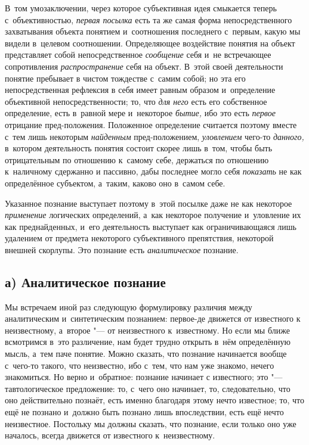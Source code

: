 В~том умозаключении, через которое субъективная идея смыкается
теперь с~объективностью, {\em первая
посылка} есть та же самая форма непосредственного
захватывания объекта понятием и~соотношения последнего с~первым, какую мы
видели в~целевом соотношении. Определяющее воздействие понятия на объект
представляет собой непосредственное
{\em сообщение} себя и~не
встречающее сопротивления
{\em распространение}
себя на объект. В~этой своей деятельности понятие пребывает в
чистом тождестве с~самим собой; но эта его непосредственная рефлексия в
себя имеет равным образом и~определение объективной непосредственности; то,
что {\em для него} есть
его собственное определение, есть в~равной мере и~некоторое
{\em бытие,} ибо это есть
{\em первое} отрицание
пред-положения. Положенное определение считается поэтому вместе
с~тем лишь некоторым {\em найденным}
пред-положением,
{\em уловлением} чего-то
{\em данного,} в~котором
деятельность понятия состоит скорее лишь в~том, чтобы быть отрицательным по
отношению к~самому себе, держаться по отношению к~наличному сдержанно и
пассивно, дабы последнее могло себя
{\em показать} не как
определённое субъектом, а~таким, каково оно в~самом себе.

Указанное познание выступает поэтому в~этой посылке даже не
как некоторое {\em применение}
логических определений, а~как некоторое получение и~уловление
их как преднайденных, и~его деятельность выступает как ограничивающаяся
лишь удалением от предмета некоторого субъективного препятствия, некоторой
внешней скорлупы. Это познание есть
{\em аналитическое}
познание.

\subsection[а) Аналитическое познание]{а) Аналитическое познание}

Мы встречаем иной раз следующую формулировку различия между
аналитическим и~синтетическим познанием: первое-де движется от известного к
неизвестному, а~второе "--- от неизвестного к~известному. Но
если мы ближе всмотримся в~это различение, нам будет трудно открыть в~нём
определённую мысль, а~тем паче понятие. Можно сказать, что познание
начинается вообще с~чего-то такого, что неизвестно, ибо с~тем, что нам уже
знакомо, нечего знакомиться. Но верно и~обратное: познание начинает с
известного; это "--- тавтологическое предложение: то, с~чего
оно начинает, то, следовательно, что оно действительно познаёт, есть именно
благодаря этому нечто известное; то, что ещё не познано и~должно быть
познано лишь впоследствии, есть ещё нечто неизвестное. Постольку мы
должны сказать, что познание, если только оно уже началось,
всегда движется от известного к~неизвестному.

